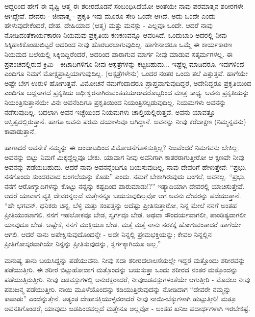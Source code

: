 ಆದ್ದರಿಂದ ಹೇಗೆ ಈ ವ್ಯಷ್ಟಿ ಆತ್ಮ ಈ ಶರೀರದೊಡನೆ ಸಂಬಂಧಿಸಿದೆಯೋ ಅಂತೆಯೇ ನಾವು ಪರಮಾತ್ಮನ ಶರೀರಗಳೇ ಆಗಿದ್ದೇವೆ. ದೇವರು - ಜೀವಾತ್ಮ - ಪ್ರಕೃತಿ ಇವು ಮೂರೂ ಸೇರಿ ಒಂದೇ ಆಗಿದೆ. ಅದು ಒಂದೇ ಎಂದು ಹೇಳುವುದೇಕೆಂದರೆ, ದೇಹ, ದೇಹಿಯಾದ (ಆತ್ಮ) ಮತ್ತು ಮನಸ್ಸು - ಎಲ್ಲವೂ ಒಂದೇ. ಆದರೆ ನಾವು ನೋಡಿದಂತೆ\break ಕಾರ್ಯಕಾರಣ ನಿಯಮವು ಪ್ರಕೃತಿಯ ಕಣಕಣವನ್ನೂ ಆವರಿಸಿದೆ. ಒಂದುಬಾರಿ ಅದರಲ್ಲಿ ನೀವು ಸಿಕ್ಕಿಹಾಕಿಕೊಂಡುಬಿಟ್ಟರೆ ಅದರಿಂದ ನೀವು ಹೊರಬರಲಾಗುವುದಿಲ್ಲ. ಹಾಗೇನಾದರೂ ಒಮ್ಮೆ ಈ ಕಾರ್ಯಕಾರಣ ನಿಯಮದ ಬಲೆಯಲ್ಲಿ ಸಿಕ್ಕಿಬಿದ್ದಿರೆಂದರೆ, ಅದರಿಂದ ಪಾರಾಗುವ ಮಾರ್ಗ ನೀವು ಮಾಡುವ ಸತ್ಕರ್ಮಗಳಲ್ಲ. ಈ ಪ್ರಪಂಚದಲ್ಲಿರುವ ಕ್ರಿಮಿ - ಕೀಟಾದಿಗಳಿಗೂ ನೀವು ಆಸ್ಪತ್ರೆಗಳನ್ನು ಕಟ್ಟಬಹುದು... ಇಷ್ಟೆಲ್ಲ ಮಾಡಿದರೂ, ಇವುಗಳಿಂದ ಎಂದಿಗೂ ನಿಮಗೆ ಮೋಕ್ಷಪ್ರಾಪ್ತಿಯಾಗುವುದಿಲ್ಲ. (ಆಸ್ಪತ್ರೆಗಳೇನು) ಒಂದರ ನಂತರ ಒಂದು ತಲೆ ಎತ್ತುತ್ತವೆ. ಹಾಗೆಯೇ ಅಷ್ಟೇ ಬೇಗ ಉರುಳಿ ಹೋಗುತ್ತವೆ. ವಿಮೋಚನೆ ನಮಗೆಂದಾದರೂ ಪ್ರಾಪ್ತವಾಗುವುದಿದ್ದರೆ, ಅದೇನಿದ್ದರೂ ಪ್ರಕೃತಿಯಿಂದ ಎಂದಿಗೂ ಬದ್ದನಾಗದೆ ಪ್ರಕೃತಿಯ ಅಧೀಶ್ವರನಾಗಿರುವಂತಹ\break ಯಾರಾದರೊಬ್ಬರಿಂದ ಮಾತ್ರ ಸಾಧ್ಯ. ಅವನು ಪ್ರಕೃತಿಯನ್ನು ನಿಯಂತ್ರಿಸುತ್ತಾನೆಯೇ ವಿನಃ ಅವನೆಂದಿಗೂ ಪ್ರಕೃತಿಯಿಂದ ನಿಯಂತ್ರಿಸಲ್ಪಡುವುದಿಲ್ಲ. ನಿಯಮಗಳು ಅವನನ್ನು ನಡೆಸುವುದಿಲ್ಲ. ಬದಲಾಗಿ ಅವನ ಇಚ್ಛೆಯಿಂದ ನಿಯಮಗಳು ಚಾಲ್ತಿಯಲ್ಲಿರುತ್ತವೆ. ಅವನು ಯಾವತ್ತೂ ಅಸ್ತಿತ್ವದಲ್ಲಿರುತ್ತಾನೆ. ಹಾಗೂ ಅವನು ಪರಮ ದಯಾಳುವೂ ಆಗಿದ್ದಾನೆ. ಅವನನ್ನು ನೀವು ಕರೆದಾಕ್ಷಣ (ನಿಮ್ಮನ್ನವನು) ಕಾಪಾಡುತ್ತಾನೆ.

ಹಾಗಾದರೆ ಅವನೇಕೆ ನಮ್ಮನ್ನು ಈ ಜಂಜಾಟದಿಂದ ವಿಮೋಚನೆಗೊಳಿಸುತ್ತಿಲ್ಲ? ನಿಜವೆಂದರೆ ನಿಮಗವನು ಬೇಕಿಲ್ಲ. ಅವನನ್ನು ಬಿಟ್ಟು ನಿಮಗೆ ಮಿಕ್ಕದ್ದೆಲ್ಲವೂ ಬೇಕು. ಯಾವಾಗ ನೀವು ಅವನಿಗಾಗಿ ಕಾತರರಾಗುತ್ತೀರೋ ಆ ಕ್ಷಣವೇ ನೀವು ಅವನನ್ನು ಪಡೆಯಬಹುದು. ಆದರೆ ನಾವು ಅವನನ್ನೆಂದಿಗೂ ಬಯಸುವುದಿಲ್ಲ. ನಾವು ದೇವರಿಗೆ ಹೇಳುತ್ತೇವೆ: “ಪ್ರಭು, ನನಗೊಂದು ಸುಂದರವಾದ ಬಂಗಲೆಯನ್ನು ಕೊಡು” ಎಂದು. ನಮಗೆ ಬೇಕಾಗಿರುವುದು ಬಂಗಲೆ, ಅವನಲ್ಲ. “ಪ್ರಭು, ನನಗೆ ಆರೋಗ್ಯಾದಿಗಳನ್ನು ಕೊಟ್ಟು ನನ್ನನ್ನು ಕಷ್ಟದಿಂದ ಪಾರುಮಾಡು!?” ಇತ್ಯಾದಿಯಾಗಿ ದೇವರಲ್ಲಿ ಯಾಚಿಸುತ್ತೇವೆ. ಆದರೆ ಯಾವಾಗ ವ್ಯಕ್ತಿ ದೇವರನ್ನಲ್ಲದೆ ಮತ್ತೇನನ್ನೂ ಬಯಸುವುದಿಲ್ಲವೋ ಆಗ ಅವನು ದೇವರನ್ನು ಪಡೆಯುತ್ತಾನೆ. “ಹೇ ಭಗವನ್, ಧನಿಕರು ಚಿನ್ನ, ಬೆಳ್ಳಿ ಮತ್ತು ಸಂಪತ್ತನ್ನು ಅದೆಷ್ಟು ಪ್ರೀತಿಸುತ್ತಾರೋ, ನಿನ್ನ ಮೇಲೆ ನನಗೆ ಅಂತಹ ಪ್ರೀತಿಯುಂಟಾಗಲಿ. ನನಗೆ ಇಹಲೋಕವೂ ಬೇಡ, ಸ್ವರ್ಗವೂ ಬೇಡ. ಅಥವಾ ಸೌಂದರ್ಯವಾಗಲೀ, ಪಾಂಡಿತ್ಯವಾಗಲೀ ಯಾವುದೂ ಬೇಡ. ಅಷ್ಟೇಕೆ, ನನಗೆ ಮುಕ್ತಿಯೂ ಬೇಡ. ಮತ್ತೆ ಮತ್ತೆ ನಾನು ನರಕಕ್ಕೆ ಹೋಗುವಂತಾದರೆ ಹಾಗೆಯೇ ಆಗಲಿ. ಆದರೆ ನಾನು ಅಪೇಕ್ಷಿಸುವುದೊಂದನ್ನೇ - ಅದೇ ನಿನ್ನಲ್ಲಿ ಪ್ರೇಮಭಕ್ತಿಯನ್ನು; ಕೇವಲ ನಿನ್ನಲ್ಲಿನ ಪ್ರೀತಿಗೋಸ್ಕರವಾಗಿಯೇ ನಿನ್ನನ್ನು ಪ್ರೀತಿಸುವುದನ್ನು, ಸ್ವರ್ಗಕ್ಕಾಗಿಯೂ ಅಲ್ಲ.''

ಮನುಷ್ಯ ತಾನು ಬಯಸಿದ್ದನ್ನು ಪಡೆಯುವನು. ನೀವು ಸದಾ ಶರೀರದ\break ಲಾಲಸೆಯಲ್ಲೇ ಇದ್ದರೆ ಮತ್ತೊಂದು ಶರೀರವನ್ನು ಪಡೆಯುತ್ತೀರಿ. ಈ ಶರೀರ ಬಿಟ್ಟುಹೋದಾಗ ಮತ್ತೊಂದನ್ನು ಬಯಸುತ್ತಾ ಒಂದು ಶರೀರದ ನಂತರ ಮತ್ತೊಂದನ್ನು ಪಡೆಯುತ್ತಿರುತ್ತೀರಿ. ನೀವು ಜಡವಸ್ತುಗಳಲ್ಲಿ ಅನುರಕ್ತರಾದರೆ, ನೀವು\break ಜಡವಸ್ತುಗಳಂತೆಯೇ ಆಗುತ್ತೀರಿ - ಮೊದಲು ನೀವು ಪಶುಜನ್ಮ ಪಡೆಯುತ್ತೀರಿ. ನಾಯಿ ಮೂಳೆಯೊಂದನ್ನು ಕಡಿಯುತ್ತಿರುವುದನ್ನು ನೋಡಿದಾಗ “ದೇವರೇ ನಮ್ಮನ್ನು ಕಾಪಾಡು'' ಎಂದೆನ್ನುತ್ತೇನೆ. ಅತ್ಯಂತ ದೇಹಾಸಕ್ತಿಯುಳ್ಳವರಾದರೆ ನೀವು ನಾಯಿ-ಬೆಕ್ಕುಗಳಾಗಿ ಹುಟ್ಟುತ್ತೀರಿ! ಮತ್ತೂ ಅವನತಿಗೊಂಡರೆ, ಯಾವುದು ಜಡಪಿಂಡವಲ್ಲದೆ ಮತ್ತೇನೂ ಅಲ್ಲವೋ - ಅಂತಹ ಖನಿಜ ಪದಾರ್ಥಗಳಾಗಿ ಇರಬೇಕಷ್ಟೆ.

